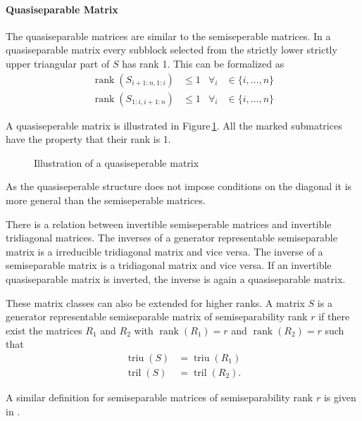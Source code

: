 \documentclass[doctype=mastersthesis,BCOR=15mm,biblatex]{ldvbook}%
\DeclareMathOperator{\rank}{rank}
\DeclareMathOperator{\triu}{triu}
\DeclareMathOperator{\tril}{tril}
\begin{document}
\paragraph{Quasiseparable Matrix}
The quasiseparable matrices are similar to the semiseperable matrices. In a quasiseparable matrix every subblock selected from the strictly lower strictly upper triangular part of $S$ has rank 1. 
This can be formalized as 
\begin{align}
\rank(S_{i+1:n,1:i}) &\leq 1 & \forall_i &\in\{i,\dots,n\}\\
\rank(S_{1:i,i+1:n}) &\leq 1 & \forall_i &\in\{i,\dots,n\}
\end{align}

A quasiseperable matrix is illustrated in Figure\,\ref{fig:quasiseperable}. All the marked submatrices have the property that their rank is 1.
\begin{figure}
	\centering
	
	\caption{Illustration of a quasiseperable matrix}
	\label{fig:quasiseperable}
\end{figure}
As the quasiseperable structure does not impose conditions on the diagonal it is more general than the semiseperable matrices.

There is a relation between invertible semiseperable matrices and invertible tridiagonal matrices.
The inverses of a generator representable semiseparable matrix is a irreducible tridiagonal matrix and vice versa. 
The inverse of a semiseparable matrix is a tridiagonal matrix and vice versa.
If an invertible quasiseparable matrix is inverted, the inverse is again a quasiseparable matrix.

These matrix classes can also be extended for higher ranks.
A matrix $S$ is a generator representable semiseparable matrix of semiseparability rank $r$ if there exist the matrices $R_1$ and $R_2$ with $\rank(R_1)=r$ and $\rank(R_2)=r$ such that
\begin{align}
\triu(S) &= \triu(R_1)\\
\tril(S) &= \tril(R_2)
.
\end{align}

A similar definition for semiseparable matrices of semiseparability rank $r$ is given in \cite{vandebril_bibliography_2005}.
\end{document}
